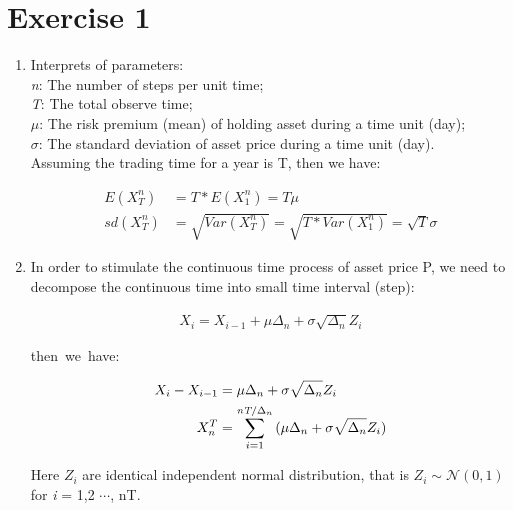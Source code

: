 \documentclass[12pt,letterpaper]{article}
\begin{document}



 




\section*{Exercise 1}
  \begin{enumerate}[label=\textbf{(\Alph*)}]
  \item Interprets of parameters:\\
 	 	  \emph{n}: The number of steps per unit time;\\
 	      \emph{T}: The total observe time;\\
 	      \emph{$\mu$}: The risk premium (mean) of holding asset during a time unit (day);\\
 	      \emph{$\sigma$}: The standard deviation of asset price during a time unit (day).\\
 	      
 	      Assuming the trading time for a year is T, then we have: \begin{center}
 	      	\begin{align}
 	      	 E(X_T^n)&=T*E(X_1^n)=T\mu \\
 	      	 sd(X_T^n)&=\sqrt{Var(X_T^n)}=\sqrt{T*Var(X_1^n)}=\sqrt{T}\sigma
 	      	\end{align}
 	      \end{center}	    
 \item In order to stimulate the continuous time process of asset price P, we need to decompose the continuous time into small time interval (step):
 
 	 \begin{center}
 	 	\begin{align}
 	 X_i=X_{i-1}+\mu\Delta_n+\sigma\sqrt{\Delta_n}Z_i
 	 \end{align}
     \end{center}  

\mbox{then we have:}
    \begin{center}
  	   \begin{align}
    X_i-X_{i-1}&=\mu\Delta_n+\sigma\sqrt{\Delta_n}Z_i \\
    X_n^T&=\sum_{i=1}^{\emph{nT}/\Delta_n}{(\mu\Delta_n+\sigma\sqrt{\Delta_n}Z_i)}
    	\end{align}
    \end{center}  
  Here ${Z_i}$ are identical independent normal distribution, that is ${Z_i} \sim  \mathcal{N}(0,1)$ for \emph{i} = 1,2 $\cdots$, nT.\\
  

\end{enumerate}
\end{document}
